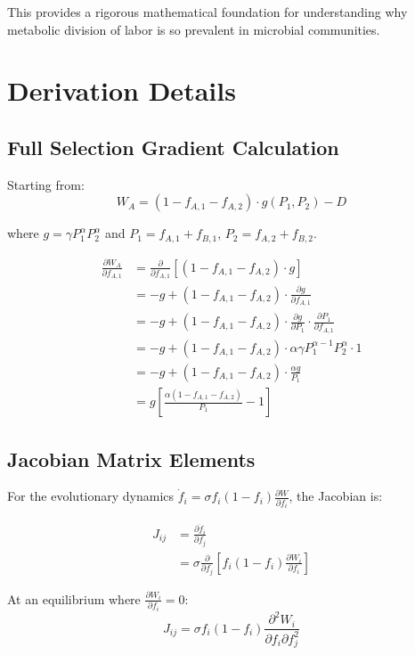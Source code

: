 \documentclass[11pt]{article}
\theoremstyle{definition}
\theoremstyle{remark}
\newcommand{\pd}[2]{\frac{\partial #1}{\partial #2}}
\newcommand{\pdd}[2]{\frac{\partial^2 #1}{\partial #2^2}}
\begin{document}
This provides a rigorous mathematical foundation for understanding why metabolic division of labor is so prevalent in microbial communities.

\appendix

\section{Derivation Details}

\subsection{Full Selection Gradient Calculation}

Starting from:
\begin{equation}
W_A = (1 - f_{A,1} - f_{A,2}) \cdot g(P_1, P_2) - D
\end{equation}

where $g = \gamma P_1^{\alpha} P_2^{\alpha}$ and $P_1 = f_{A,1} + f_{B,1}$, $P_2 = f_{A,2} + f_{B,2}$.

\begin{align}
\pd{W_A}{f_{A,1}} &= \pd{}{f_{A,1}}\left[(1 - f_{A,1} - f_{A,2}) \cdot g\right]\\
&= -g + (1 - f_{A,1} - f_{A,2}) \cdot \pd{g}{f_{A,1}}\\
&= -g + (1 - f_{A,1} - f_{A,2}) \cdot \pd{g}{P_1} \cdot \pd{P_1}{f_{A,1}}\\
&= -g + (1 - f_{A,1} - f_{A,2}) \cdot \alpha \gamma P_1^{\alpha-1} P_2^{\alpha} \cdot 1\\
&= -g + (1 - f_{A,1} - f_{A,2}) \cdot \frac{\alpha g}{P_1}\\
&= g \left[\frac{\alpha(1 - f_{A,1} - f_{A,2})}{P_1} - 1\right]
\end{align}

\subsection{Jacobian Matrix Elements}

For the evolutionary dynamics $\dot{f}_i = \sigma f_i(1-f_i) \pd{W}{f_i}$, the Jacobian is:

\begin{align}
J_{ij} &= \pd{\dot{f}_i}{f_j}\\
&= \sigma \pd{}{f_j}\left[f_i(1-f_i) \pd{W_i}{f_i}\right]
\end{align}

At an equilibrium where $\pd{W_i}{f_i} = 0$:
\begin{equation}
J_{ij} = \sigma f_i(1-f_i) \pdd{W_i}{f_i \partial f_j}
\end{equation}
\end{document}
